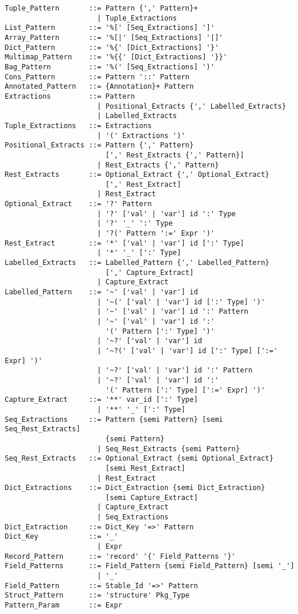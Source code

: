 \begin{lstlisting}[deletekeywords={as,with}]
Tuple_Pattern       ::= Pattern {',' Pattern}+
                      | Tuple_Extractions
List_Pattern        ::= '%[' [Seq_Extractions] ']'
Array_Pattern       ::= '%[|' [Seq_Extractions] '|]'
Dict_Pattern        ::= '%{' [Dict_Extractions] '}'
Multimap_Pattern    ::= '%{{' [Dict_Extractions] '}}'
Bag_Pattern         ::= '%(' [Seq_Extractions] ')'
Cons_Pattern        ::= Pattern '::' Pattern
Annotated_Pattern   ::= {Annotation}+ Pattern
Extractions         ::= Pattern 
                      | Positional_Extracts {',' Labelled_Extracts}
                      | Labelled_Extracts
Tuple_Extractions   ::= Extractions
                      | '(' Extractions ')'
Positional_Extracts ::= Pattern {',' Pattern} 
                        [',' Rest_Extracts {',' Pattern}]
                      | Rest_Extracts {',' Pattern}
Rest_Extracts       ::= Optional_Extract {',' Optional_Extract} 
                        [',' Rest_Extract]
                      | Rest_Extract
Optional_Extract    ::= '?' Pattern
                      | '?' ['val' | 'var'] id ':' Type
                      | '?' '_' ':' Type
                      | '?(' Pattern ':=' Expr ')'
Rest_Extract        ::= '*' ['val' | 'var'] id [':' Type]
                      | '*' '_' [':' Type]
Labelled_Extracts   ::= Labelled_Pattern {',' Labelled_Pattern} 
                        [',' Capture_Extract]
                      | Capture_Extract
Labelled_Pattern    ::= '~' ['val' | 'var'] id 
                      | '~(' ['val' | 'var'] id [':' Type] ')'
                      | '~' ['val' | 'var'] id ':' Pattern
                      | '~' ['val' | 'var'] id ':' 
                        '(' Pattern [':' Type] ')'
                      | '~?' ['val' | 'var'] id
                      | '~?(' ['val' | 'var'] id [':' Type] [':=' Expr] ')'
                      | '~?' ['val' | 'var'] id ':' Pattern
                      | '~?' ['val' | 'var'] id ':' 
                        '(' Pattern [':' Type] [':=' Expr] ')'
Capture_Extract     ::= '**' var_id [':' Type]
                      | '**' '_' [':' Type]
Seq_Extractions     ::= Pattern {semi Pattern} [semi Seq_Rest_Extracts] 
                        {semi Pattern}
                      | Seq_Rest_Extracts {semi Pattern}
Seq_Rest_Extracts   ::= Optional_Extract {semi Optional_Extract} 
                        [semi Rest_Extract]
                      | Rest_Extract
Dict_Extractions    ::= Dict_Extraction {semi Dict_Extraction}
                        [semi Capture_Extract]
                      | Capture_Extract
                      | Seq_Extractions
Dict_Extraction     ::= Dict_Key '=>' Pattern
Dict_Key            ::= '_'
                      | Expr
Record_Pattern      ::= 'record' '{' Field_Patterns '}'
Field_Patterns      ::= Field_Pattern {semi Field_Pattern} [semi '_']
                      | '_'
Field_Pattern       ::= Stable_Id '=>' Pattern
Struct_Pattern      ::= 'structure' Pkg_Type
Pattern_Param       ::= Expr
\end{lstlisting}

